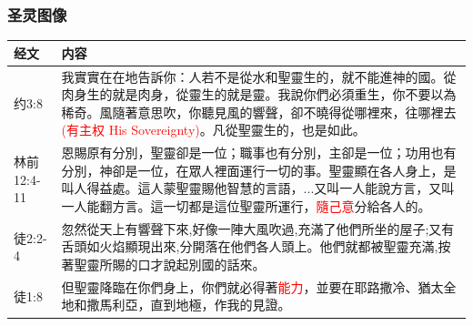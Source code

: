 \subsubsection{圣灵图像}
\begin{table}[H]
\centering
\begin{tabular}{p{6em}|p{40em}}  \toprule
经文&内容\\  \midrule
约3:8&我實實在在地告訴你：人若不是從水和聖靈生的，就不能進神的國。從肉身生的就是肉身，從靈生的就是靈。我說你們必須重生，你不要以為稀奇。風隨著意思吹，你聽見風的響聲，卻不曉得從哪裡來，往哪裡去\textcolor{red}{(有主权 His Sovereignty)}。凡從聖靈生的，也是如此。\\  \midrule

林前12:4-11&恩賜原有分別，聖靈卻是一位；職事也有分別，主卻是一位；功用也有分別，神卻是一位，在眾人裡面運行一切的事。聖靈顯在各人身上，是叫人得益處。這人蒙聖靈賜他智慧的言語，...又叫一人能說方言，又叫一人能翻方言。這一切都是這位聖靈所運行，\textcolor{red}{隨己意}分給各人的。\\  \midrule

徒2:2-4&忽然從天上有響聲下來,好像一陣大風吹過,充滿了他們所坐的屋子;又有舌頭如火焰顯現出來,分開落在他們各人頭上。他們就都被聖靈充滿,按著聖靈所賜的口才說起別國的話來。 \\  \midrule
徒1:8&但聖靈降臨在你們身上，你們就必得著\textcolor{red}{能力}，並要在耶路撒冷、猶太全地和撒馬利亞，直到地極，作我的見證。\\  \midrule
\end{tabular}
\end{table}


